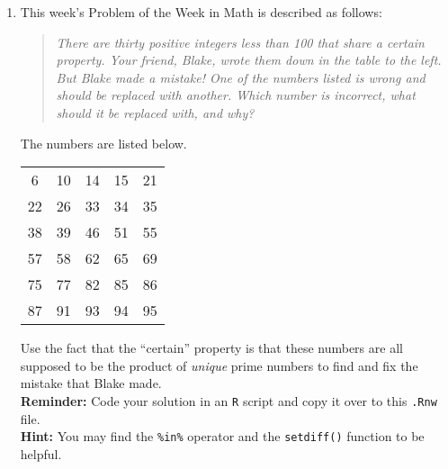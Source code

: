 \documentclass{article}\usepackage[]{graphicx}\usepackage[]{xcolor}
\begin{document}
\begin{enumerate}
\item This week's Problem of the Week in Math is described as follows:
\begin{quotation}
  \textit{There are thirty positive integers less than 100 that share a certain 
  property. Your friend, Blake, wrote them down in the table to the left. But 
  Blake made a mistake! One of the numbers listed is wrong and should be replaced 
  with another. Which number is incorrect, what should it be replaced with, and 
  why?}
\end{quotation}
The numbers are listed below.
\begin{center}
  \begin{tabular}{ccccc}
    6 & 10 & 14 & 15 & 21\\
    22 & 26 & 33 & 34 & 35\\
    38 & 39 & 46 & 51 & 55\\
    57 & 58 & 62 & 65 & 69\\
    75 & 77 & 82 & 85 & 86\\
    87 & 91 & 93 & 94 & 95
  \end{tabular}
\end{center}
Use the fact that the ``certain'' property is that these numbers are all supposed
to be the product of \emph{unique} prime numbers to find and fix the mistake that
Blake made.\\
\textbf{Reminder:} Code your solution in an \texttt{R} script and copy it over
to this \texttt{.Rnw} file.\\
\textbf{Hint:} You may find the \verb|%in%| operator and the \verb|setdiff()| function to be helpful.\\


\end{enumerate}
\end{document}
